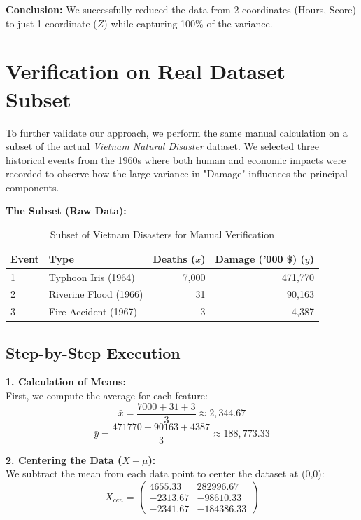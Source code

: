 \documentclass[12pt, a4paper]{report}
\begin{document}
\textbf{Conclusion:} We successfully reduced the data from 2 coordinates (Hours, Score) to just 1 coordinate ($Z$) while capturing 100\% of the variance.


\newpage
\section{Verification on Real Dataset Subset}
To further validate our approach, we perform the same manual calculation on a subset of the actual \textit{Vietnam Natural Disaster} dataset. We selected three historical events from the 1960s where both human and economic impacts were recorded to observe how the large variance in "Damage" influences the principal components.

\textbf{The Subset (Raw Data):}
\begin{table}[h]
    \centering
    \caption{Subset of Vietnam Disasters for Manual Verification}
    \label{tab:manual_real}
    \begin{tabular}{llrr}
        \toprule
        \textbf{Event} & \textbf{Type} & \textbf{Deaths ($x$)} & \textbf{Damage ('000 \$) ($y$)} \\
        \midrule
        1 & Typhoon Iris (1964) & 7,000 & 471,770 \\
        2 & Riverine Flood (1966) & 31 & 90,163 \\
        3 & Fire Accident (1967) & 3 & 4,387 \\
        \bottomrule
    \end{tabular}
\end{table}

\subsection*{Step-by-Step Execution}

\textbf{1. Calculation of Means:} \\
First, we compute the average for each feature:
\[ \bar{x} = \frac{7000 + 31 + 3}{3} \approx 2,344.67 \]
\[ \bar{y} = \frac{471770 + 90163 + 4387}{3} \approx 188,773.33 \]

\textbf{2. Centering the Data ($X - \mu$):} \\
We subtract the mean from each data point to center the dataset at (0,0):
\[
X_{cen} = \begin{pmatrix} 
4655.33 & 282996.67 \\ 
-2313.67 & -98610.33 \\ 
-2341.67 & -184386.33 
\end{pmatrix}
\]
\end{document}
